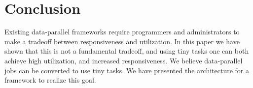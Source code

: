 \section{Conclusion}
Existing data-parallel frameworks require programmers and administrators
to make a tradeoff between responsiveness and utilization. In this paper we
have shown that this is not a fundamental tradeoff, and using tiny tasks one can both
achieve high utilization, and increased responsiveness. We believe data-parallel
jobs can be converted to use tiny tasks. We have presented the architecture for
a framework to realize this goal.

